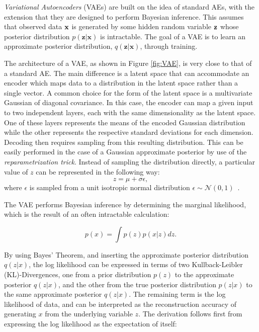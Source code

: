 \documentclass[11pt, a4paper]{article}
\begin{document}
\textit{Variational Autoencoders} (VAEs) are built on the idea of standard AEs, with the extension that they are designed to perform
Bayesian inference. 
This assumes that observed data $\textbf x$ is generated by some
hidden random variable $\textbf z$ whose posterior distribution $p(\textbf{z}|\textbf{x})$ 
is intractable. 
The goal of a VAE is to learn an approximate posterior distribution, $q(\textbf{z}|\textbf{x})$, through training.

The architecture of a VAE, as shown in Figure \ref{fig:VAE}, is very close to that of a standard AE. 
The main difference is a latent space that can accommodate an encoder which maps data to a distribution in the latent space rather than a single vector. 
A common choice for the form of the latent space is a multivariate Gaussian of diagonal covariance. 
In this case, the encoder can map a given input to two independent layers, 
each with the same dimensionality as the latent space.
One of these layers represents the means of the encoded Gaussian distribution while the other represents the respective standard deviations for each dimension.
Decoding then requires sampling from this resulting distribution. 
This can be easily performed in the case of a Gaussian approximate posterior by use of the \textit{reparametrization trick}.
Instead of sampling the distribution directly, a particular value of $z$ can be represented in the following way:
\begin{equation}
z=\mu + \sigma \epsilon,
\end{equation}
where $\epsilon$ is sampled from a unit isotropic normal distribution $\epsilon \sim \mathcal{N}(0, 1)$~\cite{kingma2014autoencoding}.


The VAE performs Bayesian inference by determining the marginal likelihood, which is the result of an often intractable calculation:

\begin{equation}
p(x) = \int p(z)p(x|z)dz.
\end{equation}

By using Bayes' Theorem, and inserting the approximate posterior distribution $q(z|x)$, the log likelihood can be expressed in terms of two Kullback-Leibler (KL)-Divergences, one from a prior distribution $p(z)$ to the approximate posterior $q(z|x)$, and the other from the true posterior distribution $p(z|x)$ to the same approximate posterior $q(z|x)$. The remaining term is the log likelihood of data, and can be interpreted as the reconstruction accuracy of generating $x$ from the underlying variable $z$. The derivation follows first from expressing the log likelihood as the expectation of itself:
\end{document}
